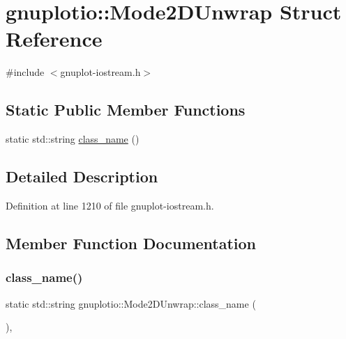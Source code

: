 \hypertarget{structgnuplotio_1_1_mode2_d_unwrap}{}\section{gnuplotio\+:\+:Mode2\+D\+Unwrap Struct Reference}
\label{structgnuplotio_1_1_mode2_d_unwrap}


{\ttfamily \#include $<$gnuplot-\/iostream.\+h$>$}

\subsection*{Static Public Member Functions}
\begin{DoxyCompactItemize}
\item 
static std\+::string \hyperlink{structgnuplotio_1_1_mode2_d_unwrap_ab2f533c9ceb52cfecaa161c64316deb9}{class\+\_\+name} ()
\end{DoxyCompactItemize}


\subsection{Detailed Description}


Definition at line 1210 of file gnuplot-\/iostream.\+h.



\subsection{Member Function Documentation}
\mbox{\label{structgnuplotio_1_1_mode2_d_unwrap_ab2f533c9ceb52cfecaa161c64316deb9}} 
\subsubsection{\texorpdfstring{class\+\_\+name()}{class\_name()}}
{\footnotesize\ttfamily static std\+::string gnuplotio\+::\+Mode2\+D\+Unwrap\+::class\+\_\+name (\begin{DoxyParamCaption}{ }\end{DoxyParamCaption})\hspace{0.3cm}{\ttfamily [inline]}, {\ttfamily [static]}}



